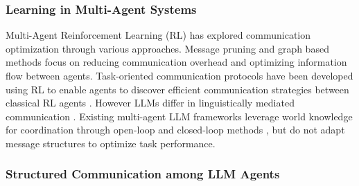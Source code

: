 \subsubsection{Learning in Multi-Agent Systems}
Multi-Agent Reinforcement Learning (RL) has explored communication optimization through various approaches. 
Message pruning \cite{singh2019message} and graph based \cite{liu2024graphneuralnetworkmeets} methods focus on reducing communication overhead and optimizing information flow between agents. 
Task-oriented communication protocols have been developed using RL to enable agents to discover efficient communication strategies between classical RL agents \cite{karten2023role,foerster2016learning}. However LLMs differ in linguistically mediated communication \cite{sumers2023cognitive}.
Existing multi-agent LLM frameworks leverage world knowledge for coordination through open-loop and closed-loop methods \cite{shinn2023reflexion}, but do not adapt message structures to optimize task performance.

\subsubsection{Structured Communication among LLM Agents}

